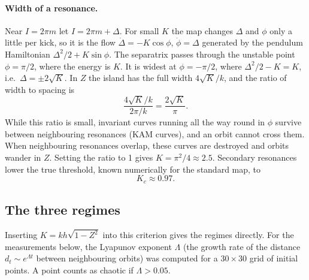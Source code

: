 \documentclass[11pt,a4paper]{article}
\begin{document}
\paragraph{Width of a resonance.}
Near $I=2\pi m$ let $I = 2\pi m + \Delta$. For small $K$ the map changes $\Delta$ and $\phi$ only a little per kick, so
it is the flow $\dot\Delta = -K\cos\phi$, $\dot\phi = \Delta$ generated by the pendulum Hamiltonian
$\Delta^2/2 + K\sin\phi$. The separatrix passes through the unstable point $\phi=\pi/2$, where the energy is $K$. It is
widest at $\phi=-\pi/2$, where $\Delta^2/2 - K = K$, i.e.\ $\Delta=\pm2\sqrt K$. In $Z$ the island has the full width
$4\sqrt K/k$, and the ratio of width to spacing is
\begin{equation}
  \frac{4\sqrt K/k}{2\pi/k} = \frac{2\sqrt K}{\pi}.
\end{equation}
While this ratio is small, invariant curves running all the way round in $\phi$ survive between neighbouring
resonances (KAM curves), and an orbit cannot cross them. When neighbouring resonances overlap, these curves are
destroyed and orbits wander in $Z$. Setting the ratio to 1 gives $K=\pi^2/4\approx2.5$. Secondary resonances lower the
true threshold, known numerically for the standard map, to
\begin{equation}
  K_c \approx 0.97 .
\end{equation}

\subsection{The three regimes}

Inserting $K = kh\sqrt{1-Z^2}$ into this criterion gives the regimes directly. For the measurements below, the
Lyapunov exponent $\Lambda$ (the growth rate of the distance $d_t\sim e^{\Lambda t}$ between neighbouring orbits) was
computed for a $30\times30$ grid of initial points. A point counts as chaotic if $\Lambda>0.05$.
\end{document}
